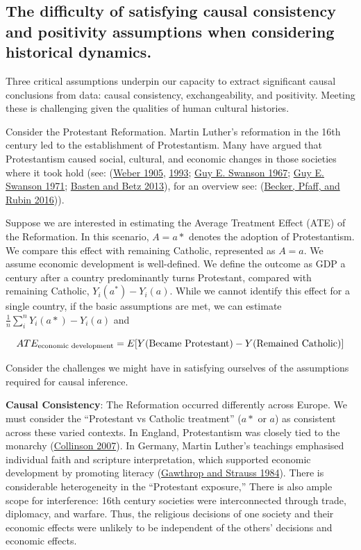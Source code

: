 \documentclass[
  singlecolumn]{report}
\begin{document}
\hypertarget{the-difficulty-of-satisfying-causal-consistency-and-positivity-assumptions-when-considering-historical-dynamics.}{%
\subsection{The difficulty of satisfying causal consistency and
positivity assumptions when considering historical
dynamics.}\label{the-difficulty-of-satisfying-causal-consistency-and-positivity-assumptions-when-considering-historical-dynamics.}}

Three critical assumptions underpin our capacity to extract significant
causal conclusions from data: causal consistency, exchangeability, and
positivity. Meeting these is challenging given the qualities of human
cultural histories.

Consider the Protestant Reformation. Martin Luther's reformation in the
16th century led to the establishment of Protestantism. Many have argued
that Protestantism caused social, cultural, and economic changes in
those societies where it took hold (see:
(\protect\hyperlink{ref-weber1905}{Weber 1905},
\protect\hyperlink{ref-weber1993}{1993};
\protect\hyperlink{ref-swanson1967}{Guy E. Swanson 1967};
\protect\hyperlink{ref-swanson1971}{Guy E. Swanson 1971};
\protect\hyperlink{ref-basten2013}{Basten and Betz 2013}), for an
overview see: (\protect\hyperlink{ref-becker2016}{Becker, Pfaff, and
Rubin 2016})).

Suppose we are interested in estimating the Average Treatment Effect
(ATE) of the Reformation. In this scenario, \(A = a*\) denotes the
adoption of Protestantism. We compare this effect with remaining
Catholic, represented as \(A = a\). We assume economic development is
well-defined. We define the outcome as GDP a century after a country
predominantly turns Protestant, compared with remaining Catholic,
\(Y_i(a^*) - Y_i(a)\). While we cannot identify this effect for a single
country, if the basic assumptions are met, we can estimate
\(\frac{1}{n} \sum_i^{n} Y_i(a*) - Y_i(a)\) and

\[ATE_{\textnormal{economic~development}} = E[Y(\textnormal{Became~Protestant}) - Y(\textnormal{Remained~Catholic})]\]

Consider the challenges we might have in satisfying ourselves of the
assumptions required for causal inference.

\textbf{Causal Consistency}: The Reformation occurred differently across
Europe. We must consider the ``Protestant vs Catholic treatment''
(\(a*\) or \(a\)) as consistent across these varied contexts. In
England, Protestantism was closely tied to the monarchy
(\protect\hyperlink{ref-collinson2007}{Collinson 2007}). In Germany,
Martin Luther's teachings emphasised individual faith and scripture
interpretation, which supported economic development by promoting
literacy (\protect\hyperlink{ref-gawthrop1984}{Gawthrop and Strauss
1984}). There is considerable heterogeneity in the ``Protestant
exposure,'' There is also ample scope for interference: 16th century
societies were interconnected through trade, diplomacy, and warfare.
Thus, the religious decisions of one society and their economic effects
were unlikely to be independent of the others' decisions and economic
effects.
\end{document}
